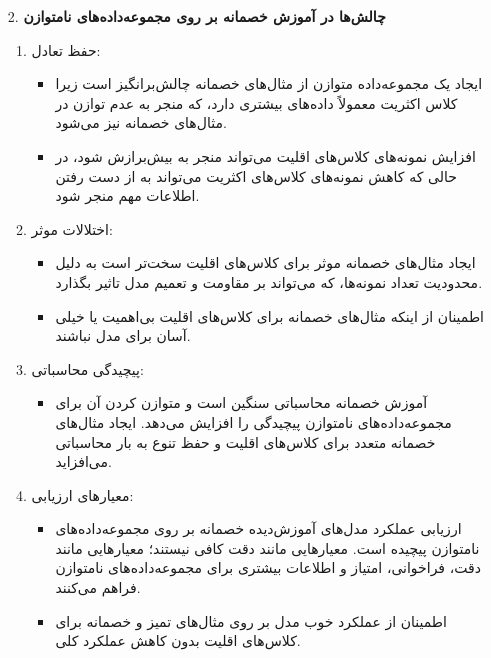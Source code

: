 \begin{qsolve}
	\begin{enumerate}
		\item [2.]\textbf{چالش‌ها در آموزش خصمانه بر روی مجموعه‌داده‌های نامتوازن}
		\begin{enumerate}
			\item حفظ تعادل:
			\begin{itemize}
				\item
ایجاد یک مجموعه‌داده متوازن از مثال‌های خصمانه چالش‌برانگیز است زیرا کلاس اکثریت معمولاً داده‌های بیشتری دارد، که منجر به عدم توازن در مثال‌های خصمانه نیز می‌شود.

				\item 
افزایش نمونه‌های کلاس‌های اقلیت می‌تواند منجر به بیش‌برازش شود، در حالی که کاهش نمونه‌های کلاس‌های اکثریت می‌تواند به از دست رفتن اطلاعات مهم منجر شود.
			\end{itemize}
			
			\item اختلالات موثر:
			\begin{itemize}
				\item 
ایجاد مثال‌های خصمانه موثر برای کلاس‌های اقلیت سخت‌تر است به دلیل محدودیت تعداد نمونه‌ها، که می‌تواند بر مقاومت و تعمیم مدل تاثیر بگذارد.

				\item 
اطمینان از اینکه مثال‌های خصمانه برای کلاس‌های اقلیت بی‌اهمیت یا خیلی آسان برای مدل نباشند.
			\end{itemize}
			
			
			\item پیچیدگی محاسباتی:
			\begin{itemize}
				\item 
آموزش خصمانه محاسباتی سنگین است و متوازن کردن آن برای مجموعه‌داده‌های نامتوازن پیچیدگی را افزایش می‌دهد. ایجاد مثال‌های خصمانه متعدد برای کلاس‌های اقلیت و حفظ تنوع به بار محاسباتی می‌افزاید.
			\end{itemize}
			
			
			\item معیارهای ارزیابی:
			\begin{itemize}
				\item 
ارزیابی عملکرد مدل‌های آموزش‌دیده خصمانه بر روی مجموعه‌داده‌های نامتوازن پیچیده است. معیارهایی مانند دقت کافی نیستند؛ معیارهایی مانند دقت، فراخوانی، امتیاز  و  اطلاعات بیشتری برای مجموعه‌داده‌های نامتوازن فراهم می‌کنند.


				\item 
اطمینان از عملکرد خوب مدل بر روی مثال‌های تمیز و خصمانه برای کلاس‌های اقلیت بدون کاهش عملکرد کلی.
			\end{itemize}
			

\end{enumerate}
\end{enumerate}
\end{qsolve}
